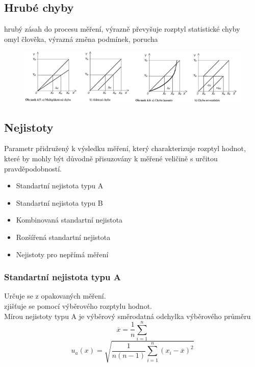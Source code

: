 \subsection*{Hrubé chyby}
hrubý zásah do procesu měření, výrazně převyšuje rozptyl statistické chyby \\
omyl člověka, výrazná změna podmínek, porucha\\
\begin{figure}[H]
    \includegraphics{images/chyby.png}

\end{figure}

\subsection*{Nejistoty}
Parametr přidružený k výsledku měření, který charakterizuje rozptyl hodnot, které by mohly být důvodně přisuzovány k měřené veličině s určitou pravděpodobností.\\
\begin{itemize}
    \item Standartní nejistota typu A
    \item Standartní nejistota typu B
    \item Kombinovaná standartní nejistota
    \item Rozšířená standartní nejistota
    \item Nejistoty pro nepřímá měření
\end{itemize}

\subsubsection*{Standartní nejistota typu A}
Určuje se  z opakovaných měření.\\
zjišťuje se pomocí výběrového rozptylu hodnot.\\
Mírou nejistoty typu A je výběrový směrodatná odchylka výběrového průměru\\
\begin{equation}
    \overline{x} = \frac{1}{n}\sum^n_{i=1}
\end{equation}
\begin{equation}
    u_a(x) = \sqrt{\frac{1}{n(n-1)}\sum^n_{i=1}(x_i-\overline{x})^2}
\end{equation}
\newpage


